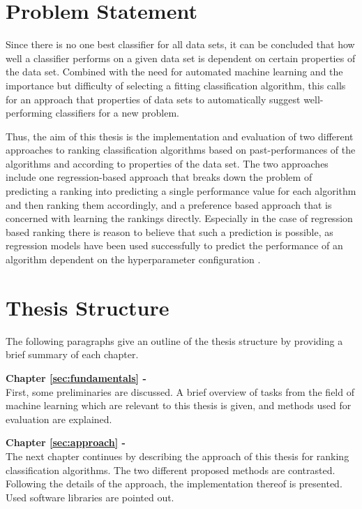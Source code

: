 \section{Problem Statement}
\label{sec:intro:problem}
Since there is no one best classifier for all data sets, it can be concluded that how well a classifier performs on a given data set is dependent on certain properties of the data set. Combined with the need for automated machine learning and the importance but difficulty of selecting a fitting classification algorithm, this calls for an approach that properties of data sets to automatically suggest well-performing classifiers for a new problem.

Thus, the aim of this thesis is the implementation and evaluation of two different approaches to ranking classification algorithms based on past-performances of the algorithms and according to properties of the data set. The two approaches include one regression-based approach that breaks down the problem of predicting a ranking into predicting a single performance value for each algorithm and then ranking them accordingly, and a preference based approach that is concerned with learning the rankings directly. Especially in the case of regression based ranking there is reason to believe that such a prediction is possible, as regression models have been used successfully to predict the performance of an algorithm dependent on the hyperparameter configuration \cite{DBLP:conf/aaai/EggenspergerHHL15}.

\section{Thesis Structure}
\label{sec:intro:structure}
The following paragraphs give an outline of the thesis structure by providing a brief summary of each chapter.

\textbf{Chapter \ref{sec:fundamentals} - } \\[0.2em]
First, some preliminaries are discussed. A brief overview of tasks from the field of machine learning which are relevant to this thesis is given, and methods used for evaluation are explained. 

\textbf{Chapter \ref{sec:approach} - } \\[0.2em]
The next chapter continues by describing the approach of this thesis for ranking classification algorithms. The two different proposed methods are contrasted. Following the details of the approach, the implementation thereof is presented. Used software libraries are pointed out.

